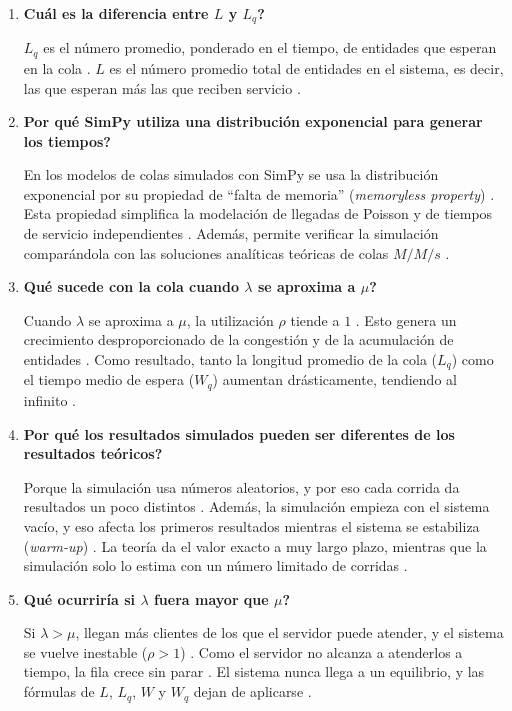\documentclass[11pt,a4paper]{article}
\begin{document}
\begin{enumerate}
    \item \textbf{\textquestiondown{}Cuál es la diferencia entre $L$ y $L_q$?}
    \par $L_q$ es el número promedio, ponderado en el tiempo, de entidades que esperan en la cola \cite{smith2024, heather2026}. $L$ es el número promedio total de entidades en el sistema, es decir, las que esperan más las que reciben servicio \cite{smith2024, heather2026}.

    \item \textbf{\textquestiondown{}Por qué SimPy utiliza una distribución exponencial para generar los tiempos?}
    \par En los modelos de colas simulados con SimPy se usa la distribución exponencial por su propiedad de ``falta de memoria'' (\emph{memoryless property}) \cite{baxter2024, smith2024}. Esta propiedad simplifica la modelación de llegadas de Poisson y de tiempos de servicio independientes \cite{heather2026, smith2024}. Además, permite verificar la simulación comparándola con las soluciones analíticas teóricas de colas $M/M/s$ \cite{heather2026, smith2024}.

    \item \textbf{\textquestiondown{}Qué sucede con la cola cuando $\lambda$ se aproxima a $\mu$?}
    \par Cuando $\lambda$ se aproxima a $\mu$, la utilización $\rho$ tiende a $1$ \cite{smith2024}. Esto genera un crecimiento desproporcionado de la congestión y de la acumulación de entidades \cite{smith2024}. Como resultado, tanto la longitud promedio de la cola ($L_q$) como el tiempo medio de espera ($W_q$) aumentan drásticamente, tendiendo al infinito \cite{smith2024}.

    \item \textbf{\textquestiondown{}Por qué los resultados simulados pueden ser diferentes de los resultados teóricos?}
    \par Porque la simulación usa números aleatorios, y por eso cada corrida da resultados un poco distintos \cite{smith2024}. Además, la simulación empieza con el sistema vacío, y eso afecta los primeros resultados mientras el sistema se estabiliza (\emph{warm-up}) \cite{smith2024, heather2026}. La teoría da el valor exacto a muy largo plazo, mientras que la simulación solo lo estima con un número limitado de corridas \cite{smith2024, heather2026}.

    \item \textbf{\textquestiondown{}Qué ocurriría si $\lambda$ fuera mayor que $\mu$?}
    \par Si $\lambda > \mu$, llegan más clientes de los que el servidor puede atender, y el sistema se vuelve inestable ($\rho > 1$) \cite{smith2024}. Como el servidor no alcanza a atenderlos a tiempo, la fila crece sin parar \cite{smith2024}. El sistema nunca llega a un equilibrio, y las fórmulas de $L$, $L_q$, $W$ y $W_q$ dejan de aplicarse \cite{smith2024}.
\end{enumerate}
\end{document}
